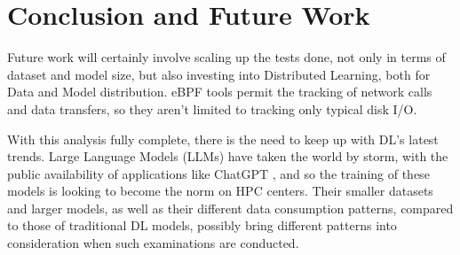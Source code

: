 \documentclass[conference]{IEEEtran}
\begin{document}
\section{Conclusion and Future Work}

Future work will certainly involve scaling up the tests done, not only in terms of dataset and model size, but also investing into Distributed Learning, both for Data and Model distribution. eBPF tools permit the tracking of network calls and data transfers, so they aren't limited to tracking only typical disk I/O.

With this analysis fully complete, there is the need to keep up with DL's latest trends. Large Language Models (LLMs) have taken the world by storm, with the public availability of applications like ChatGPT \cite{chatgpt}, and so the training of these models is looking to become the norm on HPC centers. Their smaller datasets and larger models, as well as their different data consumption patterns, compared to those of traditional DL models, possibly bring different patterns into consideration when such examinations are conducted. 


\end{document}
